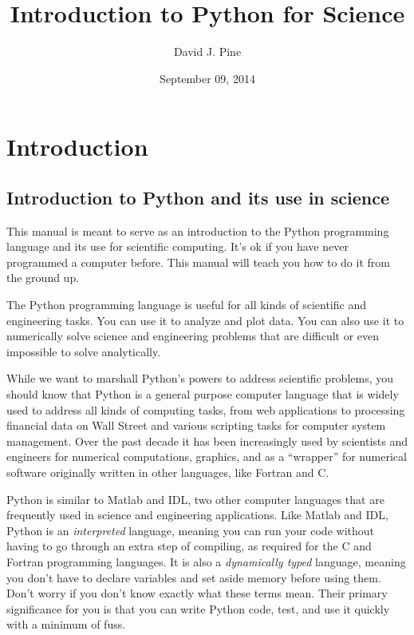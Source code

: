 \documentclass[letterpaper,10pt,english]{sphinxmanual}
\title{Introduction to Python for Science}
\date{September 09, 2014}
\author{David J. Pine}
\begin{document}
\maketitle
\tableofcontents
{}\label{latex-contents::doc}



\chapter{Introduction}
\label{chap1/chap1_intro:introduction-to-python-for-science}\label{chap1/chap1_intro:introduction}\label{chap1/chap1_intro::doc}

\section{Introduction to Python and its use in science}
\label{chap1/chap1_intro:introduction-to-python-and-its-use-in-science}
This manual is meant to serve as an introduction to the Python programming language and its use for scientific computing.  It's ok if you have never programmed a computer before.  This manual will teach you how to do it from the ground up.

The Python programming language is useful for all kinds of scientific and engineering tasks.  You can use it to analyze and plot data.  You can also use it to numerically solve science and engineering problems that are difficult or even impossible to solve analytically.

While we want to marshall Python's powers to address scientific problems, you should know that Python is a general purpose computer language that is widely used to address all kinds of computing tasks, from web applications to processing financial data on Wall Street and various scripting tasks for computer system management.  Over the past decade it has been increasingly used by scientists and engineers for numerical computations, graphics, and as a ``wrapper'' for numerical software originally written in other languages, like Fortran and C.

Python is similar to Matlab and IDL, two other computer languages that are frequently used in science and engineering applications.  Like Matlab and IDL, Python is an \emph{interpreted} language, meaning you can run your code without having to go through an extra step of compiling, as required for the C and Fortran programming languages.  It is also a \emph{dynamically typed} language, meaning you don't have to declare variables and set aside memory before using them. Don't worry if you don't know exactly what these terms mean. Their primary significance for you is that you can write Python code, test, and use it quickly with a minimum of fuss.
\end{document}
